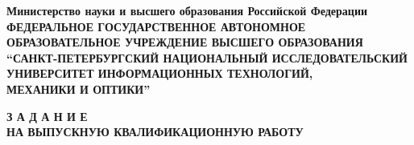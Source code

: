 
\thispagestyle{empty}

\begin{center}
  {
    \bfseries
    {
      \subnormal
      Министерство науки и высшего образования Российской Федерации
    } \\[-0.5em]
    {
      \scriptsize
      ФЕДЕРАЛЬНОЕ ГОСУДАРСТВЕННОЕ АВТОНОМНОЕ ОБРАЗОВАТЕЛЬНОЕ УЧРЕЖДЕНИЕ ВЫСШЕГО ОБРАЗОВАНИЯ
    } \\[-0.25em]
    {
      \subnormal
      “САНКТ-ПЕТЕРБУРГСКИЙ НАЦИОНАЛЬНЫЙ ИССЛЕДОВАТЕЛЬСКИЙ \\[-0.5em]
      УНИВЕРСИТЕТ ИНФОРМАЦИОННЫХ ТЕХНОЛОГИЙ, \\[-0.75em]
      МЕХАНИКИ И ОПТИКИ” \\[2em]
    }
  }
\end{center}

\small


\begin{center}
  {
    \bfseries
    {
      \normalsize
      З А Д А Н И Е \\
    }
    НА  ВЫПУСКНУЮ  КВАЛИФИКАЦИОННУЮ  РАБОТУ \\[1.5em]
  }
\end{center}

